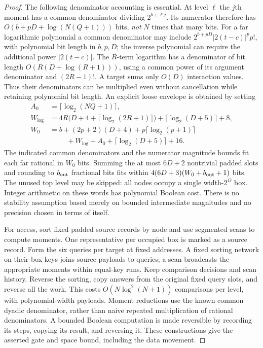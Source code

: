 \documentclass[11pt]{article}
\theoremstyle{definition}
\begin{document}
\begin{proof}
The following denominator accounting is essential. At level $\ell$ the
$j$th moment has a common denominator dividing $2^{b+\ell j}$.
Its numerator therefore has
$O(b+pD+\log(N(Q+1)))$ bits, \emph{not} $N$ times that many bits.
For a far logarithmic polynomial a common denominator may include
$2^{b+pD}|2(t-c)|^p p!$, with polynomial bit length in $b,p,D$;
the inverse polynomial can require the additional power $|2(t-c)|$.
The $R$-term logarithm has a denominator of bit length
$O(R(D+\log(R+1)))$, using a common power of its argument denominator
and $(2R-1)!$. A target sums only $O(D)$ interaction values. Thus their
denominators can be multiplied even without cancellation while retaining
polynomial bit length. An explicit loose envelope is obtained by setting
\begin{align*}
 A_0&=\lceil\log_2(NQ+1)\rceil,\\
 W_{\log}&=4R\bigl(D+4+\lceil\log_2(2R+1)\rceil\bigr)
             +\lceil\log_2(D+5)\rceil+8,\\
 W_0&=b+(2p+2)(D+4)+p\lceil\log_2(p+1)\rceil\\
    &\hspace{1cm}+W_{\log}+A_0+\lceil\log_2(D+5)\rceil+16.
\end{align*}
The indicated common denominators and the numerator magnitude bounds fit
each far rational in $W_0$ bits. Summing the at most $6D+2$ nontrivial
padded slots and rounding to $b_{\rm out}$ fractional bits fits within
$4(6D+3)(W_0+b_{\rm out}+1)$ bits. The unused top level may be skipped:
all nodes occupy a single width-$2^D$ box. Integer arithmetic
on these words has polynomial Boolean cost. There is no stability
assumption based merely on bounded intermediate magnitudes and no
precision chosen in terms of itself.

For access, sort fixed padded source records by node and use segmented
scans to compute moments. One representative per occupied box is marked
as a source record. Form the six queries per target at fixed addresses.
A fixed sorting network on their box keys joins source payloads to queries;
a scan broadcasts the appropriate moments within equal-key runs. Keep
comparison decisions and scan history. Reverse the sorting, copy answers
from the original fixed query slots, and reverse all the work. This costs
$O(N\log^2(N+1))$ comparisons per level, with polynomial-width payloads.
Moment reductions use the known common dyadic denominator, rather than
naive repeated multiplication of rational denominators. A bounded Boolean
computation is made reversible by recording its steps, copying its result,
and reversing it. These constructions give the asserted gate and space
bound, including the data movement.
\end{proof}
\end{document}
